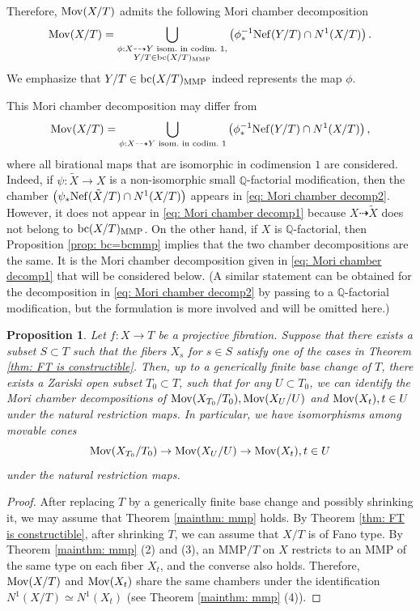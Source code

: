 \documentclass[11pt,oneside,reqno]{amsart}
\numberwithin{equation}{section}
\newtheorem{proposition}{Proposition}[section]
\theoremstyle{definition}
\newcommand{\Nef}{{\rm {Nef}}}
\newcommand{\Mov}{{\rm {Mov}}}
\newcommand{\bc}{{\rm {bc}}}
\newcommand{\dto}{\dashrightarrow}
\newcommand{\bQ}{\mathbb{Q}}
\begin{document}
Therefore, $\Mov(X/T)$ admits the following Mori chamber decomposition
\begin{equation}\label{eq: Mori chamber decomp1}
\Mov(X/T)=\bigcup_{\substack{\phi: X \dto Y \text{~isom.~in codim.~} 1,\\Y/T \in \bc(X/T)_{\rm MMP}}} \left(\phi^{-1}_{*}\Nef(Y/T) \cap N^1(X/T)\right).
\end{equation} We emphasize that $Y/T \in \bc(X/T)_{\mathrm{MMP}}$ indeed represents the map $\phi$.


This Mori chamber decomposition may differ from 
\begin{equation}\label{eq: Mori chamber decomp2}
\Mov(X/T)=\bigcup_{\phi: X \dto Y \text{~isom.~in codim.~} 1} \left(\phi^{-1}_{*}\Nef(Y/T) \cap N^1(X/T)\right),
\end{equation} where all birational maps that are isomorphic in codimension $1$ are considered. Indeed, if $\psi: \tilde X \to X$ is a non-isomorphic small $\bQ$-factorial modification, then the chamber $\left(\psi_{*}\Nef(\tilde X/T) \cap N^1(X/T)\right)$ appears in \eqref{eq: Mori chamber decomp2}. However, it does not appear in \eqref{eq: Mori chamber decomp1} because $X \dto \tilde X$ does not belong to $\bc(X/T)_{\rm MMP}$. On the other hand, if $X$ is $\bQ$-factorial, then Proposition \ref{prop: bc=bcmmp} implies that the two chamber decompositions are the same. It is the Mori chamber decomposition given in \eqref{eq: Mori chamber decomp1} that will be considered below. (A similar statement can be obtained for the decomposition in \eqref{eq: Mori chamber decomp2} by passing to a $\bQ$-factorial modification, but the formulation is more involved and will be omitted here.)


\begin{proposition}\label{prop: mov}
Let $f: X \to T$ be a projective fibration. Suppose that there exists a subset $S\subset T$ such that the fibers $X_s$ for $s\in S$ satisfy one of the cases in Theorem \ref{thm: FT is constructible}. Then, up to a generically finite base change of $T$, there exists a Zariski open subset $T_0\subset T$, such that for any $U\subset T_0$, we can identify the Mori chamber decompositions of $\Mov(X_{T_0}/T_0), \Mov(X_{U}/U)$ and $ \Mov(X_t), t\in U$ under the natural restriction maps. In particular, we have isomorphisms among movable cones 
\[
\Mov(X_{T_0}/T_0) \to \Mov(X_U/U) \to \Mov(X_t), t\in U
\] under the natural restriction maps.
\end{proposition}
\begin{proof}
After replacing $T$ by a generically finite base change and possibly shrinking it, we may assume that Theorem \ref{mainthm: mmp} holds. By Theorem \ref{thm: FT is constructible}, after shrinking $T$, we can assume that $X/T$ is of Fano type. By Theorem \ref{mainthm: mmp} (2) and (3), an MMP$/T$ on $X$ restricts to an MMP of the same type on each fiber $X_t$, and the converse also holds. Therefore, $\Mov(X/T)$ and $\Mov(X_t)$ share the same chambers under the identification $N^1(X/T) \simeq N^1(X_t)$ (see Theorem \ref{mainthm: mmp} (4)). 
\end{proof}
\end{document}
